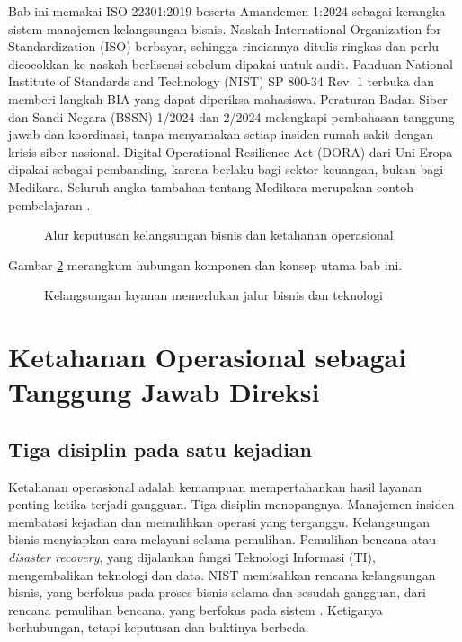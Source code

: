 Bab ini memakai ISO 22301:2019 beserta Amandemen 1:2024 sebagai kerangka sistem manajemen
kelangsungan bisnis. Naskah International Organization for Standardization (ISO) berbayar,
sehingga rinciannya ditulis ringkas dan perlu dicocokkan ke naskah berlisensi sebelum dipakai
untuk audit. Panduan National Institute of Standards and Technology (NIST) SP 800-34 Rev. 1
terbuka dan memberi langkah BIA yang dapat diperiksa mahasiswa. Peraturan Badan Siber dan Sandi
Negara (BSSN) 1/2024 dan 2/2024 melengkapi pembahasan tanggung jawab dan koordinasi, tanpa
menyamakan setiap insiden rumah sakit dengan krisis siber nasional. Digital Operational
Resilience Act (DORA) dari Uni Eropa dipakai sebagai pembanding, karena berlaku bagi sektor
keuangan, bukan bagi Medikara. Seluruh angka tambahan tentang Medikara merupakan contoh
pembelajaran
\cite{iso22301-2019,c10-iso22301-amd2024,c10-nist80034,bssn1-2024,c10-bssn2-2024,c10-dora}.

\begin{figure}[!htb]
  \centering
  
  \caption{Alur keputusan kelangsungan bisnis dan ketahanan operasional}
  \label{fig:ch10-alur}
\end{figure}

Gambar \ref{fig:ch10-ilustrasi-bab} merangkum hubungan komponen dan konsep utama bab ini.
\begin{figure}[!htb]
  \centering
  
  \caption{Kelangsungan layanan memerlukan jalur bisnis dan teknologi}
  \label{fig:ch10-ilustrasi-bab}
\end{figure}

\section{Ketahanan Operasional sebagai Tanggung Jawab Direksi}

\subsection*{Tiga disiplin pada satu kejadian}

Ketahanan operasional adalah kemampuan mempertahankan hasil layanan penting ketika terjadi
gangguan. Tiga disiplin menopangnya. Manajemen insiden membatasi kejadian dan memulihkan operasi
yang terganggu. Kelangsungan bisnis menyiapkan cara melayani selama pemulihan. Pemulihan bencana
atau \textit{disaster recovery}, yang dijalankan fungsi Teknologi Informasi (TI), mengembalikan
teknologi dan data. NIST memisahkan rencana kelangsungan bisnis, yang berfokus pada proses bisnis
selama dan sesudah gangguan, dari rencana pemulihan bencana, yang berfokus pada sistem
\cite{c10-nist80034}. Ketiganya berhubungan, tetapi keputusan dan buktinya berbeda.

